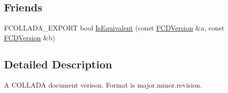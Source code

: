 \subsection*{Friends}
\begin{DoxyCompactItemize}
\item 
FCOLLADA\_\-EXPORT bool \hyperlink{classFCDVersion_af421d044408891236aa6defd618eff5f}{IsEquivalent} (const \hyperlink{classFCDVersion}{FCDVersion} \&a, const \hyperlink{classFCDVersion}{FCDVersion} \&b)
\end{DoxyCompactItemize}


\subsection{Detailed Description}
A COLLADA document verison. Format is major.minor.revision. 

